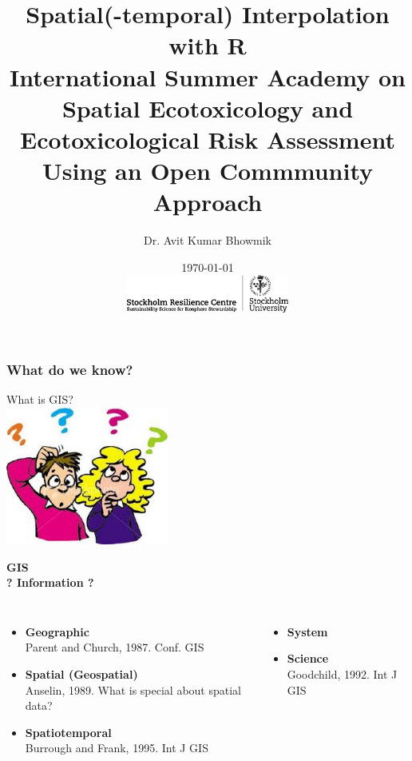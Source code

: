 \documentclass{beamer}
\title[Spatial Interpolation. Summer Academy `16]{Spatial(-temporal) Interpolation with R\\
\medskip \tiny{International Summer Academy on Spatial Ecotoxicology and Ecotoxicological Risk Assessment\\Using an Open Commmunity Approach}} %
\author[Avit Bhowmik]{Dr. Avit Kumar Bhowmik \\} %
\institute[SRC] %
{
\textit{avit.bhowmik@su.se}%
}
\date[\today]{\today \\[0.5cm]
\includegraphics[width=0.4\textwidth]{Figures/SRC_logo.png}} %
\begin{document}
\begin{frame}
\titlepage %
\end{frame}


\begin{frame}
\frametitle{What do we know?}
\centering
\Huge \alert{What is GIS?}\\
\vspace{1cm}
\includegraphics[width=0.4\textwidth]{Figures/Questions.png}
\end{frame}


\begin{frame}
\centering
\Huge \alert{\textbf{GIS}}\\
\pause
\Large \textbf{? Information ?}
\pause
\medskip
\normalsize
\begin{columns}[t]
\begin{itemize}
\item \alert{\textbf{Geographic}}\\
Parent and Church, 1987. Conf. GIS
\item \alert {\textbf {Spatial (Geospatial)}}\\
Anselin, 1989. What is special about spatial data?
\item \alert{\textbf{Spatiotemporal}}\\
Burrough and Frank, 1995. Int J GIS
\end{itemize}
\hspace{2cm}
\pause
{}
\begin{itemize}
\item \alert{\textbf{System}}
\item \alert{\textbf{Science}}\\
Goodchild, 1992. Int J GIS
\end{itemize}
\end{columns}
\end{frame}
\end{document}
